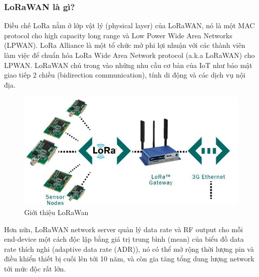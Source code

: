 \subsubsection{LoRaWAN là gì?}
Điều chế LoRa nằm ở lớp vật lý (physical layer) của LoRaWAN, nó là một MAC protocol cho high capacity long range và Low Power Wide Area Networks (LPWAN). LoRa Alliance là một tổ chức mở phi lợi nhuận với các thành viên làm việc để chuẩn hóa LoRa Wide Area Network protocol (a.k.a LoRaWAN) cho LPWAN. LoRaWAN chú trong vào những nhu cầu cơ bản của IoT như bảo mật giao tiếp 2 chiều (bidirection communication), tính di động và các dịch vụ nội địa.\\
\begin{center}
\begin{figure}[htp]
\begin{center}
\includegraphics[scale=0.55]{image5/lora.jpg}
\end{center}
\caption{Giới thiệu LoRaWan}
\end{figure}
\end{center}
Hơn nữa, LoRaWAN network server quản lý data rate và RF output cho mỗi end-device một cách độc lập bằng giá trị trung bình (mean) của biểu đồ data rate thích nghi (adaptive data rate (ADR)), nó có thể mở rộng thời lượng pin và điều khiển thiết bị cuối lên tới 10 năm, và còn gia tăng tổng dung lượng network tới mức độc rất lớn.
